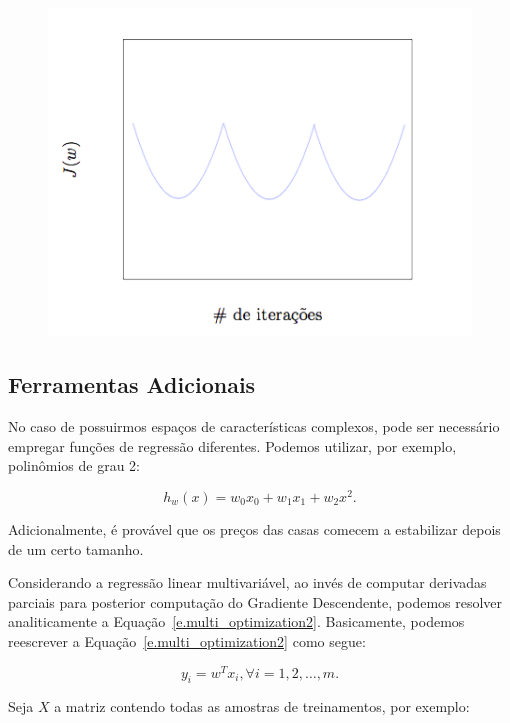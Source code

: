 \begin{figure}[h]
\hspace*{66pt}
\includegraphics[scale=0.63]{figs/gd_multi_graph.png}
\label{f.gd_multi_graph}
\end{figure}

\subsection{Ferramentas Adicionais}
\label{s.additional_tools}

No caso de possuirmos espaços de características complexos, pode ser necessário empregar funções de regressão diferentes. Podemos utilizar, por exemplo, polinômios de grau 2:

\begin{equation}
\label{e.second_regression}
h_w(x) = w_0x_0 + w_1x_1 + w_2x^2.	
\end{equation}

Adicionalmente, é provável que os preços das casas comecem a estabilizar depois de um certo tamanho.

Considerando a regressão linear multivariável, ao invés de computar derivadas parciais para posterior computação do Gradiente Descendente, podemos resolver analiticamente a Equação~\ref{e.multi_optimization2}. Basicamente, podemos reescrever a Equação~\ref{e.multi_optimization2} como segue:

\begin{equation}
\label{e.multi_optimization3}
y_i = w^Tx_i, \forall i = 1, 2, \dots, m.
\end{equation}

Seja $X$ a matriz contendo todas as amostras de treinamentos, por exemplo:


